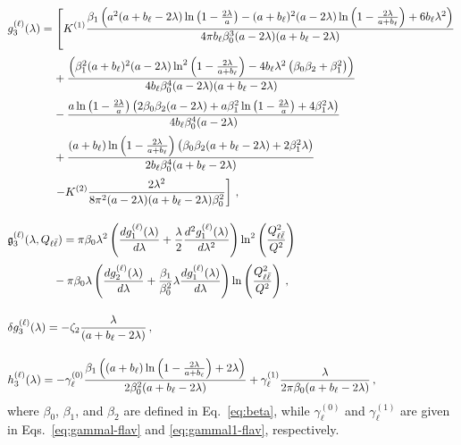 \begin{subequations}
\begin{align}
	&g_3^{(\ell)}(\lambda)=\left[K^{(1)}\frac{\beta_1\left(a^2(a+b_{\ell}-2\lambda)\ln\left(1-\frac{2\lambda}{a}\right)-(a+b_{\ell})^2(a-2\lambda)\ln\left(1-\frac{2\lambda}{a+b_{\ell}}\right)+6b_{\ell}\lambda^2\right)}{4\pi b_{\ell}\beta_0^3(a-2\lambda)(a+b_{\ell}-2\lambda)}\right.\notag \\[0.5ex]
	&\qquad\qquad+\frac{\left(\beta_1^2(a+b_{\ell})^2(a-2\lambda)\ln^2\left(1-\frac{2\lambda}{a+b_{\ell}}\right)-4b_{\ell}\lambda^2\left(\beta_0\beta_2+\beta_1^2\right)\right)}{4 b_{\ell}\beta_0^4(a-2\lambda)(a+b_{\ell}-2\lambda)} \notag \\[0.5ex]
	&\qquad\qquad-\frac{a\ln\left(1-\frac{2\lambda}{a}\right)\left(2\beta_0\beta_2(a-2\lambda)+a\beta_1^2\ln\left(1-\frac{2\lambda}{a}\right)+4\beta_1^2\lambda\right)}{4b_{\ell}\beta_0^4(a-2\lambda)} \notag\\[0.5ex]
	&\qquad\qquad+\frac{(a+b_{\ell})\ln\left(1-\frac{2\lambda}{a+b_{\ell}}\right)\left(\beta_0\beta_2(a+b_{\ell}-2\lambda)+2\beta_1^2\lambda\right)}{2b_{\ell}\beta_0^4(a+b_{\ell}-2\lambda)} \notag\\[0.5ex]
	&\left.\qquad\qquad -K^{(2)}\frac{2\lambda^2}{8\pi^2(a-2\lambda)(a+b_{\ell}-2\lambda)\beta_0^2} \right]\,, \\[2.5ex]
&\mathfrak{g}_3^{(\ell)}(\lambda,Q_{\ell\bar\ell})=\pi\beta_0\lambda^2\left(\frac{dg_1^{(\ell)}(\lambda)}{d\lambda}+\frac{\lambda}{2}\frac{d^2g_1^{(\ell)}(\lambda)}{d\lambda^2}\right)\ln^2\left(\frac{Q_{\ell\bar\ell}^2}{Q^2}\right)\notag \\[0.5ex]
&\qquad\qquad -\pi\beta_0\lambda\left(\frac{dg_2^{(\ell)}(\lambda)}{d\lambda}+\frac{\beta_1}{\beta_0^2}\lambda\frac{dg_1^{(\ell)}(\lambda)}{d\lambda}\right)\ln\left(\frac{Q_{\ell\bar\ell}^2}{Q^2}\right)\,, \\[2.5ex]
&\delta g_3^{(\ell)}(\lambda)=-\zeta_2\frac{\lambda}{(a+b_{\ell}-2\lambda)}\,,\\[2.5ex]
&h_3^{(\ell)}(\lambda)=-\gamma_{\ell}^{(0)}\frac{\beta_1\left((a+b_{\ell})\ln\left(1-\frac{2\lambda}{a+b_{\ell}}\right)+2\lambda\right)}{2\beta_0^2(a+b_{\ell}-2\lambda)}
+\gamma_{\ell}^{(1)}\frac{\lambda}{2\pi\beta_0(a+b_{\ell}-2\lambda)}\,,
\end{align}
\end{subequations}
where $\beta_0$, $\beta_1$, and $\beta_2$ are defined in
Eq.~\eqref{eq:beta}, while $\gamma_\ell^{(0)}$ and
$\gamma_\ell^{(1)}$ are given in
Eqs.~\eqref{eq:gammal-flav} and \eqref{eq:gammal1-flav},
respectively.


